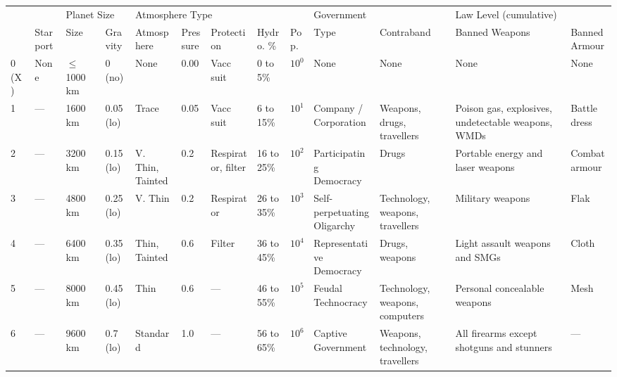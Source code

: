 \documentclass[landscape]{cheatsheet}
\begin{document}
\begin{tabularx}{\linewidth}{l|l|l|l|l|l|l|l|l|l|X|X|l}
  \multicolumn{1}{l}{} & \multicolumn{1}{l}{} & \multicolumn{2}{l}{Planet Size} & \multicolumn{3}{l}{Atmosphere Type} & \multicolumn{1}{l}{} & \multicolumn{1}{l}{} & \multicolumn{2}{l}{Government} & \multicolumn{2}{l}{Law Level (cumulative)} \\ \cmidrule(lr){3-4} \cmidrule(lr){5-7} \cmidrule(lr){10-11} \cmidrule(lr){12-13}
  \multicolumn{1}{l}{} & \multicolumn{1}{l}{Starport} & \multicolumn{1}{l}{Size} & \multicolumn{1}{l}{Gravity} & \multicolumn{1}{l}{Atmosphere} & \multicolumn{1}{l}{Pressure} & \multicolumn{1}{l}{Protection} & \multicolumn{1}{l}{Hydro. \%} & \multicolumn{1}{l}{Pop.} & \multicolumn{1}{l}{Type} & \multicolumn{1}{l}{Contraband} & \multicolumn{1}{l}{Banned Weapons} & \multicolumn{1}{l}{Banned Armour} \\ \midrule
  0 (X)  & None      & $\leq$\SI{1000}{\kilo\meter} & 0 (no)    & None             & 0.00      & Vacc suit          & 0 to 5\%    &  $10^{0}$ & None & None & None & None \\
  1      & ---       &  \SI{1600}{\kilo\meter}      & 0.05 (lo) & Trace            & 0.05      & Vacc suit          & 6 to 15\%   &  $10^{1}$ & Company / Corporation & Weapons, drugs, travellers & Poison gas, explosives, undetectable weapons, WMDs & Battle dress \\
  2      & ---       &  \SI{3200}{\kilo\meter}      & 0.15 (lo) & V. Thin, Tainted & 0.2       & Respirator, filter & 16 to 25\%  &  $10^{2}$ & Participating Democracy & Drugs & Portable energy and laser weapons & Combat armour \\
  3      & ---       &  \SI{4800}{\kilo\meter}      & 0.25 (lo) & V. Thin          & 0.2       & Respirator         & 26 to 35\%  &  $10^{3}$ & Self-perpetuating Oligarchy & Technology, weapons, travellers & Military weapons & Flak \\ \midrule
  4      & ---       &  \SI{6400}{\kilo\meter}      & 0.35 (lo) & Thin, Tainted    & 0.6       & Filter             & 36 to 45\%  &  $10^{4}$ & Representative Democracy & Drugs, weapons & Light assault weapons and SMGs & Cloth \\
  5      & ---       &  \SI{8000}{\kilo\meter}      & 0.45 (lo) & Thin             & 0.6       & ---                & 46 to 55\%  &  $10^{5}$ & Feudal Technocracy & Technology, weapons, computers & Personal concealable weapons & Mesh \\
  6      & ---       &  \SI{9600}{\kilo\meter}      & 0.7 (lo)  & Standard         & 1.0       & ---                & 56 to 65\%  &  $10^{6}$ & Captive Government & Weapons, technology, travellers & All firearms except shotguns and stunners & --- \\

\end{tabularx}
\end{document}
